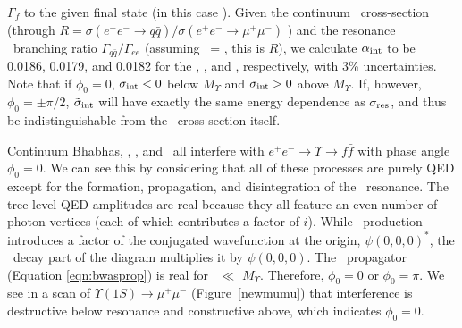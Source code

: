 \documentclass{cornell}
\begin{document}
$\Gamma_f$ to the given final state (in this case \qqbar).  Given the
continuum \qqbar\ cross-section (through $R = \sigma(e^+e^- \to
q\bar{q})/\sigma(e^+e^- \to \mu^+\mu^-)$ \cite{novor}) and the
resonance \qqbar\ branching ratio $\Gamma_{q\bar{q}}/\Gamma_{ee}$
(assuming \bee\ = \bmm, this is $R$), we calculate $\alpha_{\mbox{\scriptsize int}}$
to be 0.0186, 0.0179, and 0.0182 for the \us, \uss, and \usss,
respectively, with 3\% uncertainties.  Note that if $\phi_0 = 0$,
$\tilde{\sigma}_{\mbox{\scriptsize int}} < 0$ below $M_\Upsilon$ and
$\tilde{\sigma}_{\mbox{\scriptsize int}} > 0$ above $M_\Upsilon$.  If, however, $\phi_0
= \pm\pi/2$, $\tilde{\sigma}_{\mbox{\scriptsize int}}$ will have exactly the same energy
dependence as $\sigma_{\mbox{\scriptsize res}}$, and thus be indistinguishable from the
\ups\ cross-section itself.

Continuum Bhabhas, \mumu, \tautau, and \qqbar\ all interfere with
$e^+e^- \to \Upsilon \to f\bar{f}$ with phase angle $\phi_0 = 0$.  We
can see this by considering that all of these processes are purely QED
except for the formation, propagation, and disintegration of the \ups\
resonance.  The tree-level QED amplitudes are real because they all
feature an even number of photon vertices (each of which contributes a
factor of $i$).  While \ups\ production introduces a factor of the
conjugated wavefunction at the origin, $\psi(0,0,0)^*$, the \ups\
decay part of the diagram multiplies it by $\psi(0,0,0)$.  The \ups\
propagator (Equation \ref{eqn:bwasprop}) is real for \ecm\ $\ll$
$M_\Upsilon$.  Therefore, $\phi_0=0$ or $\phi_0=\pi$.  We see in a
scan of $\Upsilon(1S) \to \mu^+\mu^-$ (Figure~\ref{newmumu}) that
interference is destructive below resonance and constructive above,
which indicates $\phi_0=0$.
\end{document}
